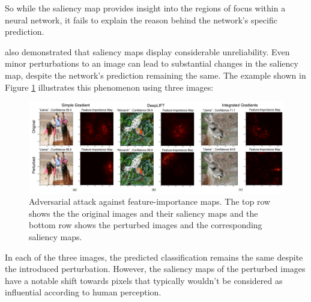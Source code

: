 So while the saliency map provides insight into the regions of focus within a neural network, it fails to explain the reason behind the network's specific prediction\cite{rudin2019stop}.

\cite{Ghorbani_Abid_Zou_2019} also demonstrated that saliency maps display considerable unreliability. Even minor perturbations to an image can lead to substantial changes in the saliency map, despite the network's prediction remaining the same. The example shown in Figure \ref{fig:advers} illustrates this phenomenon using three images:

\begin{figure}[H]
    \centering
    \includegraphics[width=0.9\linewidth]{pics/advers.png}
    \caption{Adversarial attack against feature-importance maps. The top row shows the the original images and their saliency maps and the bottom row shows the perturbed images and the corresponding saliency maps.\cite{Ghorbani_Abid_Zou_2019}}
    \label{fig:advers}
\end{figure}

In each of the three images, the predicted classification remains the same despite the introduced perturbation. However, the saliency maps of the perturbed images have a notable shift towards pixels that typically wouldn't be considered as influential according to human perception.
